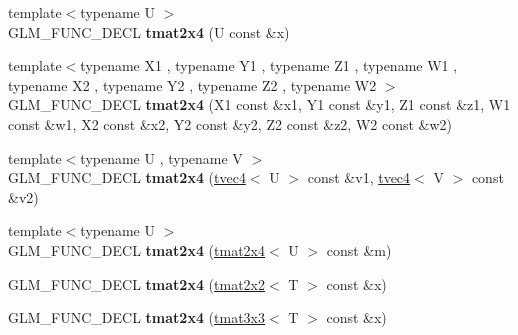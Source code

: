 \begin{DoxyCompactItemize}
\item 
\hypertarget{structglm_1_1detail_1_1tmat2x4_a03f772ad4ebee440631b9cb0a738ac28}{{\footnotesize template$<$typename U $>$ }\\G\-L\-M\-\_\-\-F\-U\-N\-C\-\_\-\-D\-E\-C\-L {\bfseries tmat2x4} (U const \&x)}\label{structglm_1_1detail_1_1tmat2x4_a03f772ad4ebee440631b9cb0a738ac28}

\item 
\hypertarget{structglm_1_1detail_1_1tmat2x4_a77fe9faca8e8861e4869fa09b0b19d54}{{\footnotesize template$<$typename X1 , typename Y1 , typename Z1 , typename W1 , typename X2 , typename Y2 , typename Z2 , typename W2 $>$ }\\G\-L\-M\-\_\-\-F\-U\-N\-C\-\_\-\-D\-E\-C\-L {\bfseries tmat2x4} (X1 const \&x1, Y1 const \&y1, Z1 const \&z1, W1 const \&w1, X2 const \&x2, Y2 const \&y2, Z2 const \&z2, W2 const \&w2)}\label{structglm_1_1detail_1_1tmat2x4_a77fe9faca8e8861e4869fa09b0b19d54}

\item 
\hypertarget{structglm_1_1detail_1_1tmat2x4_a69bd317a5f087319096249d9639442f1}{{\footnotesize template$<$typename U , typename V $>$ }\\G\-L\-M\-\_\-\-F\-U\-N\-C\-\_\-\-D\-E\-C\-L {\bfseries tmat2x4} (\hyperlink{structglm_1_1detail_1_1tvec4}{tvec4}$<$ U $>$ const \&v1, \hyperlink{structglm_1_1detail_1_1tvec4}{tvec4}$<$ V $>$ const \&v2)}\label{structglm_1_1detail_1_1tmat2x4_a69bd317a5f087319096249d9639442f1}

\item 
\hypertarget{structglm_1_1detail_1_1tmat2x4_aad8759b0cf4e809304f75f24ee007aad}{{\footnotesize template$<$typename U $>$ }\\G\-L\-M\-\_\-\-F\-U\-N\-C\-\_\-\-D\-E\-C\-L {\bfseries tmat2x4} (\hyperlink{structglm_1_1detail_1_1tmat2x4}{tmat2x4}$<$ U $>$ const \&m)}\label{structglm_1_1detail_1_1tmat2x4_aad8759b0cf4e809304f75f24ee007aad}

\item 
\hypertarget{structglm_1_1detail_1_1tmat2x4_a99a7f8713b447d8bdb2da21b045a75fe}{G\-L\-M\-\_\-\-F\-U\-N\-C\-\_\-\-D\-E\-C\-L {\bfseries tmat2x4} (\hyperlink{structglm_1_1detail_1_1tmat2x2}{tmat2x2}$<$ T $>$ const \&x)}\label{structglm_1_1detail_1_1tmat2x4_a99a7f8713b447d8bdb2da21b045a75fe}

\item 
\hypertarget{structglm_1_1detail_1_1tmat2x4_a025ab21514405a293a5f692d05c58593}{G\-L\-M\-\_\-\-F\-U\-N\-C\-\_\-\-D\-E\-C\-L {\bfseries tmat2x4} (\hyperlink{structglm_1_1detail_1_1tmat3x3}{tmat3x3}$<$ T $>$ const \&x)}\label{structglm_1_1detail_1_1tmat2x4_a025ab21514405a293a5f692d05c58593}


\end{DoxyCompactItemize}
